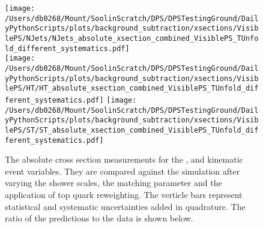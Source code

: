 \begin{figure}[hp]
	\centering
	\texttt{[image: /Users/db0268/Mount/SoolinScratch/DPS/DPSTestingGround/DailyPythonScripts/plots/background\_subtraction/xsections/VisiblePS/NJets/NJets\_absolute\_xsection\_combined\_VisiblePS\_TUnfold\_different\_systematics.pdf]} \\
	\texttt{[image: /Users/db0268/Mount/SoolinScratch/DPS/DPSTestingGround/DailyPythonScripts/plots/background\_subtraction/xsections/VisiblePS/HT/HT\_absolute\_xsection\_combined\_VisiblePS\_TUnfold\_different\_systematics.pdf]}
	\texttt{[image: /Users/db0268/Mount/SoolinScratch/DPS/DPSTestingGround/DailyPythonScripts/plots/background\_subtraction/xsections/VisiblePS/ST/ST\_absolute\_xsection\_combined\_VisiblePS\_TUnfold\_different\_systematics.pdf]} \\
	\caption[The absolute cross section measurements for the \NJET{}, \HT{} and \ST{} kinematic event variables. They are compared against the \powhegpythia{} simulation after varying the shower scales, the \hdamp{} matching parameter and the application of top quark \pt{} reweighting. The verticle bars represent statistical and systematic uncertainties added in quadrature. The ratio of the predictions to the data is shown below.]{The absolute cross section measurements for the \NJET{}, \HT{} and \ST{} kinematic event variables. They are compared against the \powhegpythia{} simulation after varying the shower scales, the \hdamp{} matching parameter and the application of top quark \pt{} reweighting. The verticle bars represent statistical and systematic uncertainties added in quadrature. The ratio of the predictions to the data is shown below.}
	\label{fig:combXSecSysAbs1}
\end{figure}
